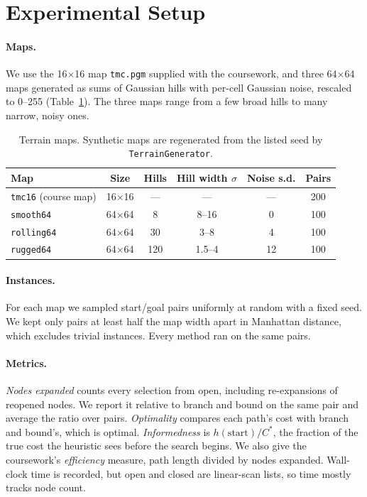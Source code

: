\documentclass[11pt]{article}
\begin{document}
\section{Experimental Setup}

\paragraph{Maps.}
We use the 16$\times$16 map \texttt{tmc.pgm} supplied with the coursework, and three 64$\times$64 maps generated as sums of Gaussian hills with per-cell Gaussian noise, rescaled to 0--255 (Table~\ref{tab:maps}). The three maps range from a few broad hills to many narrow, noisy ones.

\begin{table}[t]
\centering
\caption{Terrain maps. Synthetic maps are regenerated from the listed seed by \texttt{TerrainGenerator}.}
\label{tab:maps}
\begin{tabular}{lccccc}
\toprule
Map & Size & Hills & Hill width $\sigma$ & Noise s.d. & Pairs \\
\midrule
\texttt{tmc16} (course map) & 16$\times$16 & --- & --- & --- & 200 \\
\texttt{smooth64} & 64$\times$64 & 8 & 8--16 & 0 & 100 \\
\texttt{rolling64} & 64$\times$64 & 30 & 3--8 & 4 & 100 \\
\texttt{rugged64} & 64$\times$64 & 120 & 1.5--4 & 12 & 100 \\
\bottomrule
\end{tabular}
\end{table}

\paragraph{Instances.}
For each map we sampled start/goal pairs uniformly at random with a fixed seed. We kept only pairs at least half the map width apart in Manhattan distance, which excludes trivial instances. Every method ran on the same pairs.

\paragraph{Metrics.}
\emph{Nodes expanded} counts every selection from open, including re-expansions of reopened nodes. We report it relative to branch and bound on the same pair and average the ratio over pairs. \emph{Optimality} compares each path's cost with branch and bound's, which is optimal. \emph{Informedness} is $h(\text{start})/C^*$, the fraction of the true cost the heuristic sees before the search begins. We also give the coursework's \emph{efficiency} measure, path length divided by nodes expanded. Wall-clock time is recorded, but open and closed are linear-scan lists, so time mostly tracks node count.
\end{document}

